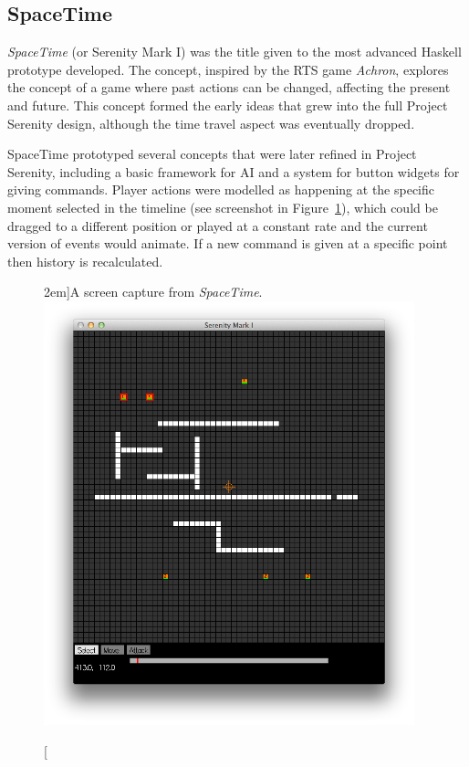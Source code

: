 \subsection{SpaceTime}
\label{ssec:spacetime}

\emph{SpaceTime} (or Serenity Mark I) was the title given to the most advanced Haskell prototype developed. The concept, inspired by the RTS game \emph{Achron}, explores the concept of a game where past actions can be changed, affecting the present and future. This concept formed the early ideas that grew into the full Project Serenity design, although the time travel aspect was eventually dropped.

SpaceTime prototyped several concepts that were later refined in Project Serenity, including a basic framework for AI and a system for button widgets for giving commands. Player actions were modelled as happening at the specific moment selected in the timeline (see screenshot in Figure~\ref{fig:spacetimescreen}), which could be dragged to a different position or played at a constant rate and the current version of events would animate. If a new command is given at a specific point then history is recalculated.

\begin{figure}
	\caption[A screen from \emph{SpaceTime}][2em]{A screen capture from \emph{SpaceTime}.}
	\includegraphics[width=29em]{res/spacetime/spacetimescreen.png}
	\label{fig:spacetimescreen}
\end{figure}

